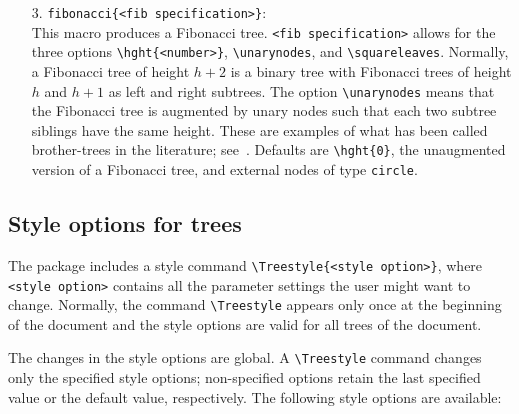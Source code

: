 \begin{enumerate}
\item[3.] \verb.fibonacci{<fib specification>}.:\\                              
     This macro produces a Fibonacci tree.              
     \verb.<fib specification>. allows for the three options                    
     \verb.\hght{<number>}., \verb.\unarynodes.,                                 
     and \verb.\squareleaves..                                                  
     Normally, a Fibonacci tree of height $h+2$ is a binary tree                
     with Fibonacci trees of height $h$ and $h+1$ as left and                   
     right subtrees. The option \verb.\unarynodes. means that the               
     Fibonacci tree is augmented by unary nodes such that each                  
     two subtree siblings have the same height. These are examples
     of what has been called brother-trees in the literature; 
     see~\cite{Brother}. Defaults are                    
     \verb.\hght{0}., the unaugmented version of a Fibonacci tree,              
     and external nodes of type \verb.circle..                                  
\end{enumerate}                                                                 
                                                                                
\subsection{Style options for trees}
\sloppy                                            
The \TreeTeX{} package includes a style command                           
\verb.\Treestyle{<style option>}., where \verb.<style option>.                   
contains all the parameter settings the user might want                         
to change.                                                                      
Normally, the command \verb.\Treestyle. appears only once at the beginning      
of the document and the style options are valid for all trees of the            
document.      

\fussy                                                                                
The changes in the style options are global. A \verb.\Treestyle. command        
changes only the specified style options; non-specified options retain          
the last specified value or the default value, respectively. The following            
style options are available:                                                    
                                                                                
